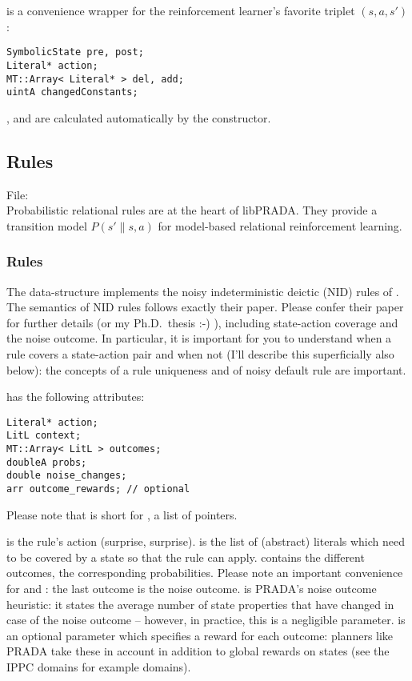 \documentclass[10pt,twoside,twocolumn,fleqn]{article}
\begin{document}
 is a convenience wrapper for the reinforcement
learner's favorite triplet $(s,a,s')$:
\begin{lstlisting}
SymbolicState pre, post;
Literal* action;
MT::Array< Literal* > del, add;
uintA changedConstants;
\end{lstlisting}
,  and  are calculated
automatically by the constructor.





\subsection{Rules}

File: \\

Probabilistic relational rules are at the heart of libPRADA. They provide
a transition model $P(s' \| s,a)$ for model-based relational reinforcement
learning.


\subsubsection{Rules}

The data-structure  implements the noisy indeterministic deictic
(NID) rules of \cite{pasula07ai}. The semantics of NID rules follows
exactly their paper. Please confer their paper for further details (or my
Ph.D.~thesis \citet{11-lang-phd} :-) ), including state-action coverage
and the noise outcome. In particular, it is important for you to understand
when a rule covers a state-action pair and when not (I'll describe this
superficially also below): the concepts of a rule uniqueness and of noisy
default rule are important.

 has the following attributes:
\begin{lstlisting}
Literal* action;
LitL context;
MT::Array< LitL > outcomes;
doubleA probs;
double noise_changes;
arr outcome_rewards; // optional
\end{lstlisting}
Please note that  is short for , a
list of  pointers.

 is the rule's action (surprise, surprise).  is
the list of (abstract) literals which need to be covered by a state so that
the rule can apply.  contains the different outcomes,
 the corresponding probabilities. Please note an important
convenience for  and : the last outcome is
the noise outcome.  is PRADA's noise outcome
heuristic: it states the average number of state properties that have
changed in case of the noise outcome -- however, in practice, this is a
negligible parameter.  is an optional parameter
which specifies a reward for each outcome: planners like PRADA take these
in account in addition to global rewards on states (see the IPPC domains
for example domains).
\end{document}
